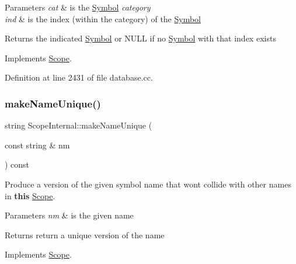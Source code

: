 \begin{DoxyParams}{Parameters}
{\em cat} & is the \mbox{\hyperlink{class_symbol}{Symbol}} {\itshape category} \\
\hline
{\em ind} & is the index (within the category) of the \mbox{\hyperlink{class_symbol}{Symbol}} \\
\hline
\end{DoxyParams}
\begin{DoxyReturn}{Returns}
the indicated \mbox{\hyperlink{class_symbol}{Symbol}} or N\+U\+LL if no \mbox{\hyperlink{class_symbol}{Symbol}} with that index exists 
\end{DoxyReturn}


Implements \mbox{\hyperlink{class_scope_a491a168d7ea71f00da419dd864901ccb}{Scope}}.



Definition at line 2431 of file database.\+cc.

\mbox{\label{class_scope_internal_a193e6fb792e7cad6e451c8ecf2f7e589}} 
\subsubsection{\texorpdfstring{makeNameUnique()}{makeNameUnique()}}
{\footnotesize\ttfamily string Scope\+Internal\+::make\+Name\+Unique (\begin{DoxyParamCaption}\item[{const string \&}]{nm }\end{DoxyParamCaption}) const\hspace{0.3cm}{\ttfamily [virtual]}}



Produce a version of the given symbol name that won\textquotesingle{}t collide with other names in {\bfseries{this}} \mbox{\hyperlink{class_scope}{Scope}}. 


\begin{DoxyParams}{Parameters}
{\em nm} & is the given name \\
\hline
\end{DoxyParams}
\begin{DoxyReturn}{Returns}
return a unique version of the name 
\end{DoxyReturn}


Implements \mbox{\hyperlink{class_scope_a2e0d945c44f4874743496b2814fbb631}{Scope}}.



